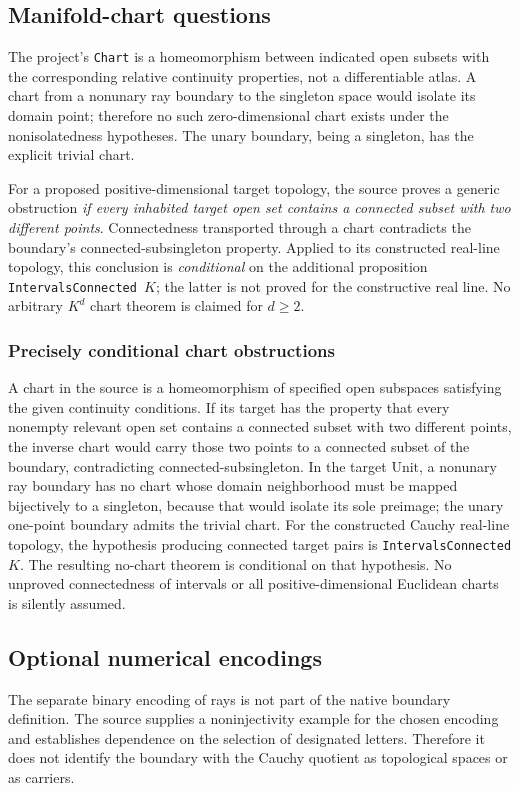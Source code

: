 \documentclass[11pt,reqno]{amsart}
\theoremstyle{definition}\newtheorem{definition}[theorem]{Definition}
\theoremstyle{remark}\newtheorem{remark}[theorem]{Remark}
\begin{document}
\subsection{Manifold-chart questions}\label{main:sub-36}
The project's \texttt{Chart} is a homeomorphism between indicated open subsets with the corresponding relative continuity properties, not a differentiable atlas. A chart from a nonunary ray boundary to the singleton space would isolate its domain point; therefore no such zero-dimensional chart exists under the nonisolatedness hypotheses. The unary boundary, being a singleton, has the explicit trivial chart.

For a proposed positive-dimensional target topology, the source proves a generic obstruction \emph{if every inhabited target open set contains a connected subset with two different points}. Connectedness transported through a chart contradicts the boundary's connected-subsingleton property. Applied to its constructed real-line topology, this conclusion is \emph{conditional} on the additional proposition \texttt{IntervalsConnected $K$}; the latter is not proved for the constructive real line. No arbitrary $K^d$ chart theorem is claimed for $d\ge2$.


\medskip
\subsubsection*{Precisely conditional chart obstructions}\label{supp:10-7}
A chart in the source is a homeomorphism of specified open subspaces satisfying the given continuity conditions. If its target has the property that every nonempty relevant open set contains a connected subset with two different points, the inverse chart would carry those two points to a connected subset of the boundary, contradicting connected-subsingleton. In the target $\mathrm{Unit}$, a nonunary ray boundary has no chart whose domain neighborhood must be mapped bijectively to a singleton, because that would isolate its sole preimage; the unary one-point boundary admits the trivial chart. For the constructed Cauchy real-line topology, the hypothesis producing connected target pairs is \texttt{IntervalsConnected $K$}. The resulting no-chart theorem is conditional on that hypothesis. No unproved connectedness of intervals or all positive-dimensional Euclidean charts is silently assumed.
\medskip

\subsection{Optional numerical encodings}\label{main:sub-37}
The separate binary encoding of rays is not part of the native boundary definition. The source supplies a noninjectivity example for the chosen encoding and establishes dependence on the selection of designated letters. Therefore it does not identify the boundary with the Cauchy quotient as topological spaces or as carriers.
\end{document}
